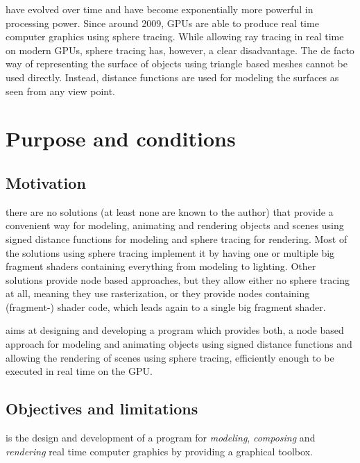 \documentclass[%
    a4paper,    %
    justified,  %
    nobib,      %
    openany     %
]{tufte-book}
\makeatletter
\renewcommand{\label}[1]{\@tufte@label{##1}}%
\makeatother
\begin{document}
 have evolved over time and have
become exponentially more powerful in processing power. Since around 2009, GPUs are able to
produce real time computer graphics using sphere tracing. While allowing ray
tracing in real time on modern GPUs, sphere tracing has, however, a clear
disadvantage. The de facto way of representing the surface of objects using triangle based
meshes cannot be used directly. Instead, distance functions are used for
modeling the surfaces as seen from any view point.

\section{Purpose and conditions}
\label{sec:purpose}

\subsection{Motivation}
\label{subsec:motivation}

 there are no solutions (at least none are
known to the author) that provide a convenient way for modeling, animating and
rendering objects and scenes using signed distance functions for modeling and
sphere tracing for rendering.
Most of the solutions using sphere tracing implement it by having one or
multiple big fragment shaders containing everything from modeling to lighting.
Other solutions provide node based approaches, but they allow either no sphere
tracing at all, meaning they use rasterization, or they provide nodes containing
(fragment-) shader code, which leads again to a single big fragment shader.

 aims at designing and developing a program which
provides both, a node based approach for modeling and animating objects using
signed distance functions and allowing the rendering of scenes using sphere
tracing, efficiently enough to be executed in real time on the GPU.

\subsection{Objectives and limitations}
\label{subsec:objectives}

 is the design and development of a
program for \textit{modeling}, \textit{composing} and \textit{rendering} real
time computer graphics by providing a graphical toolbox.
\end{document}
